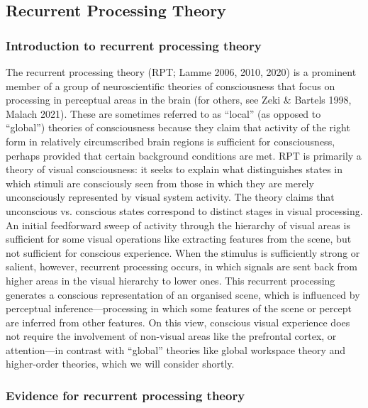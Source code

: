 \documentclass[12pt]{article}
\begin{document}
\subsection{Recurrent Processing Theory}

\subsubsection{Introduction to recurrent processing theory}

The recurrent processing theory (RPT; Lamme 2006, 2010, 2020) is a prominent member of a group of neuroscientific theories of consciousness that focus on processing in perceptual areas in the brain (for others, see Zeki \& Bartels 1998, Malach 2021). These are sometimes referred to as ``local'' (as opposed to ``global'') theories of consciousness because they claim that activity of the right form in relatively circumscribed brain regions is sufficient for consciousness, perhaps provided that certain background conditions are met. RPT is primarily a theory of visual consciousness: it seeks to explain what distinguishes states in which stimuli are consciously seen from those in which they are merely unconsciously represented by visual system activity. The theory claims that unconscious vs. conscious states correspond to distinct stages in visual processing. An initial feedforward sweep of activity through the hierarchy of visual areas is sufficient for some visual operations like extracting features from the scene, but not sufficient for conscious experience. When the stimulus is sufficiently strong or salient, however, recurrent processing occurs, in which signals are sent back from higher areas in the visual hierarchy to lower ones. This recurrent processing generates a conscious representation of an organised scene, which is influenced by perceptual inference—processing in which some features of the scene or percept are inferred from other features. On this view, conscious visual experience does not require the involvement of non-visual areas like the prefrontal cortex, or attention—in contrast with ``global'' theories like global workspace theory and higher-order theories, which we will consider shortly.

\subsubsection{Evidence for recurrent processing theory}
\end{document}
